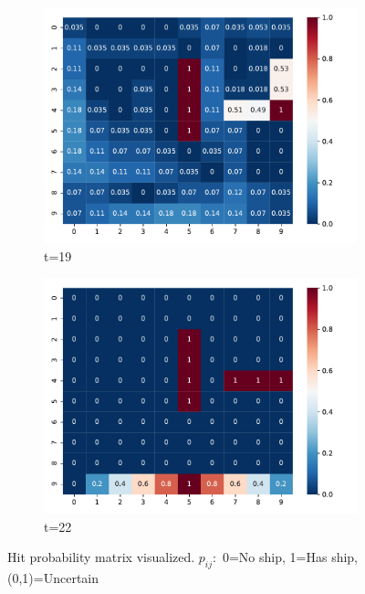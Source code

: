 \begin{figure}
    
    \begin{subfigure}{0.4\textwidth}
        \includegraphics[scale=0.4]{figure/pmatrix/19.pdf}
        \caption{t=19}
    \end{subfigure}
    \begin{subfigure}{0.4\textwidth}
        \includegraphics[scale=0.4]{figure/pmatrix/22.pdf}
        \caption{t=22}
    \end{subfigure}
    \caption{Hit probability matrix visualized. $p_{ij}:$ 0=No ship, 1=Has ship, (0,1)=Uncertain}
    \label{fig:Pmatrix}
\end{figure}

